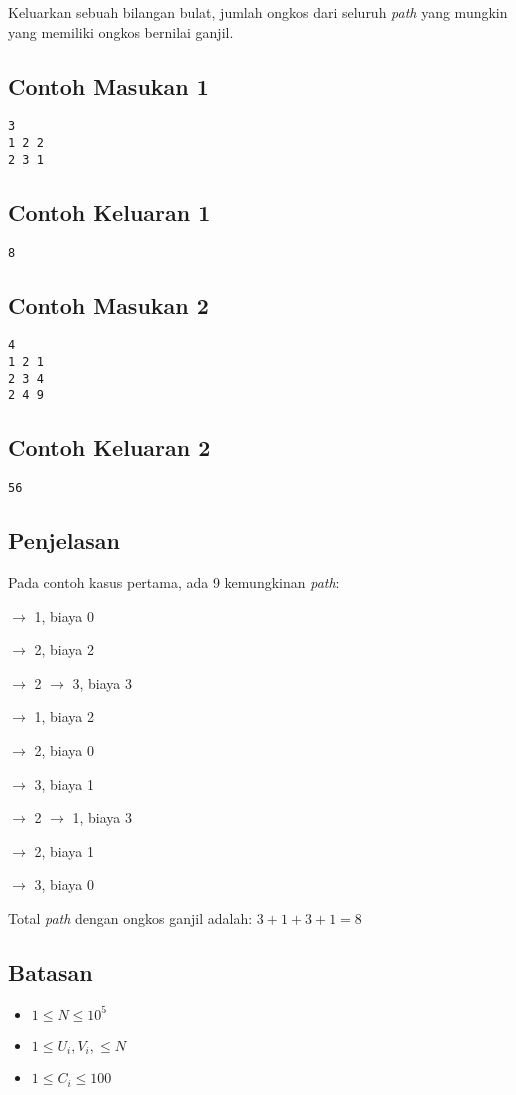 \documentclass{article}
\begin{document}
\par\noindent Keluarkan sebuah bilangan bulat, jumlah ongkos dari seluruh  \textit{path} yang mungkin yang memiliki ongkos bernilai ganjil.

\subsection*{Contoh Masukan 1}
\begin{lstlisting}
3
1 2 2
2 3 1
\end{lstlisting}
\subsection*{Contoh Keluaran 1}
\begin{lstlisting}
8
\end{lstlisting}

\subsection*{Contoh Masukan 2}
\begin{lstlisting}
4
1 2 1
2 3 4
2 4 9
\end{lstlisting}
\subsection*{Contoh Keluaran 2}
\begin{lstlisting}
56
\end{lstlisting}

\subsection*{Penjelasan}
\par\noindent
Pada contoh kasus pertama, ada 9 kemungkinan  \textit{path}:
\par{} $\rightarrow$ 1, biaya 0
\par{} $\rightarrow$  2, biaya 2
\par{} $\rightarrow$  2 $\rightarrow$  3, biaya 3
\par{} $\rightarrow$  1, biaya 2
\par{} $\rightarrow$  2, biaya 0
\par{} $\rightarrow$  3, biaya 1
\par{} $\rightarrow$  2 $\rightarrow$  1, biaya 3
\par{} $\rightarrow$  2, biaya 1
\par{} $\rightarrow$  3, biaya 0
\newline
\par\noindent
Total  \textit{path} dengan ongkos ganjil adalah: $3 + 1 + 3 + 1 = 8$

\subsection*{Batasan}

\begin{itemize}
	\item $1 \leq N \leq 10^5$
    \item $1 \leq U_i, V_i, \leq N$
    \item $1 \leq C_i \leq 100$
\end{itemize}
\end{document}
